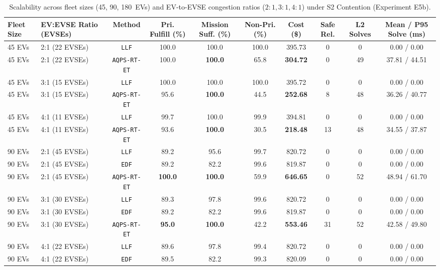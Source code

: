 \documentclass[final,3p,times,twocolumn]{elsarticle}
\begin{document}
\begin{table}[htbp]
\centering
\caption{Scalability across fleet sizes (45, 90, 180~EVs) and EV-to-EVSE congestion ratios ($2:1, 3:1, 4:1$) under S2 Contention (Experiment E5b).}
\label{tab:scalability}
\footnotesize
\begin{tabular}{llcccccccc}
\toprule
Fleet Size & EV:EVSE Ratio (EVSEs) & Method & Pri. Fulfill (\%) & Mission Suff. (\%) & Non-Pri. (\%) & Cost (\$) & Safe Rel. & L2 Solves & Mean / P95 Solve (ms) \\
\midrule
45 EVs  & 2:1 (22 EVSEs) & \texttt{LLF}        & 100.0 & 100.0 & 100.0 & 395.73 & 0  & 0  & 0.00 / 0.00 \\
45 EVs  & 2:1 (22 EVSEs) & \texttt{AQPS-RT-ET} & 100.0 & \textbf{100.0} & 65.8  & \textbf{304.72} & 0  & 49 & 37.81 / 44.51 \\
45 EVs  & 3:1 (15 EVSEs) & \texttt{LLF}        & 100.0 & 100.0 & 100.0 & 395.72 & 0  & 0  & 0.00 / 0.00 \\
45 EVs  & 3:1 (15 EVSEs) & \texttt{AQPS-RT-ET} & 95.6  & \textbf{100.0} & 44.5  & \textbf{252.68} & 8  & 48 & 36.26 / 40.77 \\
45 EVs  & 4:1 (11 EVSEs) & \texttt{LLF}        & 99.7  & 100.0 & 99.9  & 394.81 & 0  & 0  & 0.00 / 0.00 \\
45 EVs  & 4:1 (11 EVSEs) & \texttt{AQPS-RT-ET} & 93.6  & \textbf{100.0} & 30.5  & \textbf{218.48} & 13 & 48 & 34.55 / 37.87 \\
\midrule
90 EVs  & 2:1 (45 EVSEs) & \texttt{LLF}        & 89.2  & 95.6  & 99.7  & 820.72 & 0  & 0  & 0.00 / 0.00 \\
90 EVs  & 2:1 (45 EVSEs) & \texttt{EDF}        & 89.2  & 82.2  & 99.6  & 819.87 & 0  & 0  & 0.00 / 0.00 \\
90 EVs  & 2:1 (45 EVSEs) & \texttt{AQPS-RT-ET} & \textbf{100.0} & \textbf{100.0} & 59.9  & \textbf{646.65} & 0  & 52 & 48.94 / 61.70 \\
90 EVs  & 3:1 (30 EVSEs) & \texttt{LLF}        & 89.3  & 97.8  & 99.6  & 820.72 & 0  & 0  & 0.00 / 0.00 \\
90 EVs  & 3:1 (30 EVSEs) & \texttt{EDF}        & 89.2  & 82.2  & 99.6  & 819.87 & 0  & 0  & 0.00 / 0.00 \\
90 EVs  & 3:1 (30 EVSEs) & \texttt{AQPS-RT-ET} & \textbf{95.0}  & \textbf{100.0} & 42.2  & \textbf{553.46} & 31 & 52 & 42.58 / 49.80 \\
90 EVs  & 4:1 (22 EVSEs) & \texttt{LLF}        & 89.6  & 97.8  & 99.4  & 820.72 & 0  & 0  & 0.00 / 0.00 \\
90 EVs  & 4:1 (22 EVSEs) & \texttt{EDF}        & 89.5  & 82.2  & 99.3  & 820.09 & 0  & 0  & 0.00 / 0.00 \\

\end{tabular}
\end{table}
\end{document}
